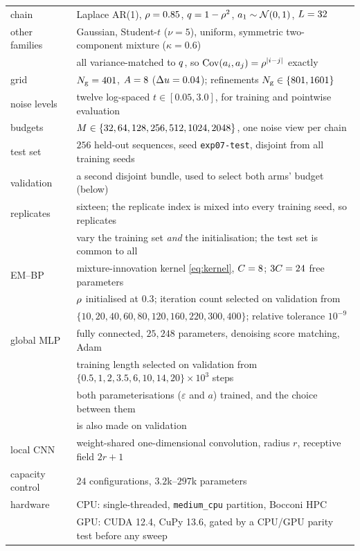 \begin{center}
\small
\begin{tabular}{ll}
\toprule
chain & Laplace AR(1), $\rho=0.85$, $q=1-\rho^2$, $a_1\sim\mathcal{N}\!\left(0,1\right)$, $L=32$ \\
other families & Gaussian, Student-$t$ ($\nu=5$), uniform, symmetric two-component mixture
                 ($\kappa=0.6$) \\
                & all variance-matched to $q$, so $\operatorname{Cov}(a_i,a_j)=\rho^{|i-j|}$ exactly \\
grid & $N_{\mathrm{g}}=401$, $A=8$ ($\Delta u=0.04$); refinements $N_{\mathrm{g}}\in\{801,1601\}$ \\
noise levels & twelve log-spaced $t\in[0.05,3.0]$, for training and pointwise evaluation \\
budgets & $M\in\{32,64,128,256,512,1024,2048\}$, one noise view per chain \\
test set & $256$ held-out sequences, seed \texttt{exp07-test}, disjoint from all training seeds \\
validation & a second disjoint bundle, used to select both arms' budget (below) \\
replicates & sixteen; the replicate index is mixed into every training seed, so replicates \\
           & vary the training set \emph{and} the initialisation; the test set is common to all \\
\midrule
EM--BP & mixture-innovation kernel \eqref{eq:kernel}, $C=8$; $3C=24$ free
         parameters \\
       & $\rho$ initialised at $0.3$; iteration count selected on validation from \\
       & $\{10,20,40,60,80,120,160,220,300,400\}$; relative tolerance $10^{-9}$ \\
global MLP & fully connected, $25{,}248$ parameters, denoising score matching, Adam \\
           & training length selected on validation from
             $\{0.5,1,2,3.5,6,10,14,20\}\times10^{3}$ steps \\
           & both parameterisations ($\varepsilon$ and $a$) trained, and the choice between
             them \\
           & is also made on validation \\
local CNN & weight-shared one-dimensional convolution, radius $r$, receptive field $2r+1$ \\
capacity control & $24$ configurations, $3.2$k--$297$k parameters \\
\midrule
hardware & CPU: single-threaded, \texttt{medium\_cpu} partition, Bocconi HPC \\
         & GPU: CUDA 12.4, CuPy 13.6, gated by a CPU/GPU parity test before any sweep \\
\bottomrule
\end{tabular}
\end{center}

